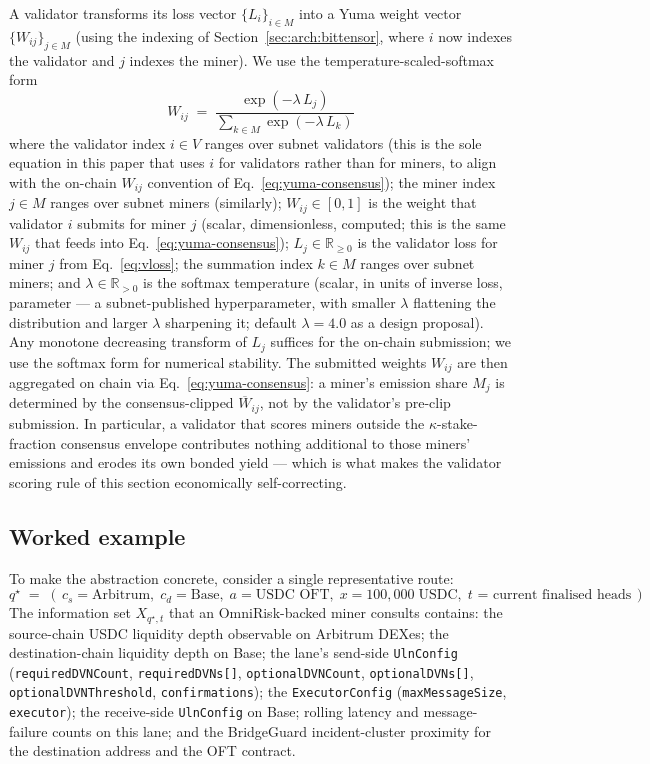 \documentclass[11pt,a4paper]{article}
\begin{document}
A validator transforms its loss vector $\{L_i\}_{i \in M}$ into a Yuma weight vector
$\{W_{ij}\}_{j \in M}$ (using the indexing of Section~\ref{sec:arch:bittensor}, where $i$
now indexes the validator and $j$ indexes the miner). We use the
temperature-scaled-softmax form
\begin{equation}
  W_{ij} \;=\; \frac{\exp(-\lambda \, L_j)}{\sum_{k \in M} \exp(-\lambda \, L_k)}
  \label{eq:vweight}
\end{equation}
where the validator index $i \in V$ ranges over subnet validators (this is the
sole equation in this paper that uses $i$ for validators rather than for miners,
to align with the on-chain $W_{ij}$ convention of
Eq.~\eqref{eq:yuma-consensus}); the miner index $j \in M$ ranges over subnet
miners (similarly); $W_{ij} \in [0, 1]$ is the weight that validator $i$
submits for miner $j$ (scalar, dimensionless, computed; this is the same
$W_{ij}$ that feeds into Eq.~\eqref{eq:yuma-consensus}); $L_j \in
\mathbb{R}_{\ge 0}$ is the validator loss for miner $j$ from
Eq.~\eqref{eq:vloss}; the summation index $k \in M$ ranges over subnet
miners; and $\lambda \in \mathbb{R}_{>0}$ is the softmax temperature
(scalar, in units of inverse loss, parameter --- a subnet-published
hyperparameter, with smaller $\lambda$ flattening the distribution and larger
$\lambda$ sharpening it; default $\lambda = 4.0$ as a design proposal). Any
monotone decreasing transform of $L_j$ suffices for the on-chain submission;
we use the softmax form for numerical stability. The submitted
weights $W_{ij}$ are then aggregated on chain via Eq.~\eqref{eq:yuma-consensus}: a
miner's emission share $M_j$ is determined by the consensus-clipped
$\overline{W}_{ij}$, not by the validator's pre-clip submission. In particular, a
validator that scores miners outside the $\kappa$-stake-fraction consensus envelope
contributes nothing additional to those miners' emissions and erodes its own bonded
yield --- which is what makes the validator scoring rule of this section economically
self-correcting.

\subsection{Worked example}\label{sec:formal:example}

To make the abstraction concrete, consider a single representative route:
\[
  q^{\star} \;=\; (\,c_s = \text{Arbitrum},\; c_d = \text{Base},\; a = \text{USDC OFT},\;
                   x = 100{,}000\;\text{USDC},\; t \text{ = current finalised heads}\,) \,.
\]
The information set $X_{q^{\star}, t}$ that an OmniRisk-backed miner consults contains:
the source-chain USDC liquidity depth observable on Arbitrum DEXes; the destination-chain
liquidity depth on Base; the lane's send-side \texttt{UlnConfig}
(\texttt{requiredDVNCount}, \texttt{requiredDVNs[]}, \texttt{optionalDVNCount},
\texttt{optionalDVNs[]}, \texttt{optionalDVNThreshold}, \texttt{confirmations}); the
\texttt{ExecutorConfig} (\texttt{maxMessageSize}, \texttt{executor}); the receive-side
\texttt{UlnConfig} on Base; rolling latency and message-failure counts on this lane; and
the BridgeGuard incident-cluster proximity for the destination address and the OFT
contract.
\end{document}
